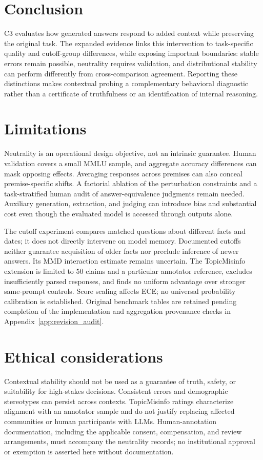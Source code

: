 \documentclass[11pt]{article}
\theoremstyle{plain}
\theoremstyle{definition}
\theoremstyle{remark}
\newif\ifrevisionmarkup
\DeclareRobustCommand{\revisioncolor}{\ifrevisionmarkup\color{red}\fi}
\newenvironment{revision}{\par\begingroup\revisioncolor}{\par\endgroup}
\begin{document}
\begin{revision}
\section{Conclusion}
C3 evaluates how generated answers respond to added context while preserving the original task. The expanded evidence links this intervention to task-specific quality and cutoff-group differences, while exposing important boundaries: stable errors remain possible, neutrality requires validation, and distributional stability can perform differently from cross-comparison agreement. Reporting these distinctions makes contextual probing a complementary behavioral diagnostic rather than a certificate of truthfulness or an identification of internal reasoning.

\section*{Limitations}
Neutrality is an operational design objective, not an intrinsic guarantee. Human validation covers a small MMLU sample, and aggregate accuracy differences can mask opposing effects. Averaging responses across premises can also conceal premise-specific shifts. A factorial ablation of the perturbation constraints and a task-stratified human audit of answer-equivalence judgments remain needed. Auxiliary generation, extraction, and judging can introduce bias and substantial cost even though the evaluated model is accessed through outputs alone.

The cutoff experiment compares matched questions about different facts and dates; it does not directly intervene on model memory. Documented cutoffs neither guarantee acquisition of older facts nor preclude inference of newer answers. Its MMD interaction estimate remains uncertain. The TopicMisinfo extension is limited to 50 claims and a particular annotator reference, excludes insufficiently parsed responses, and finds no uniform advantage over stronger same-prompt controls. Score scaling affects ECE; no universal probability calibration is established. Original benchmark tables are retained pending completion of the implementation and aggregation provenance checks in Appendix~\ref{app:revision_audit}.

\section*{Ethical considerations}
Contextual stability should not be used as a guarantee of truth, safety, or suitability for high-stakes decisions. Consistent errors and demographic stereotypes can persist across contexts. TopicMisinfo ratings characterize alignment with an annotator sample and do not justify replacing affected communities or human participants with LLMs. Human-annotation documentation, including the applicable consent, compensation, and review arrangements, must accompany the neutrality records; no institutional approval or exemption is asserted here without documentation.
\end{revision}
\end{document}
